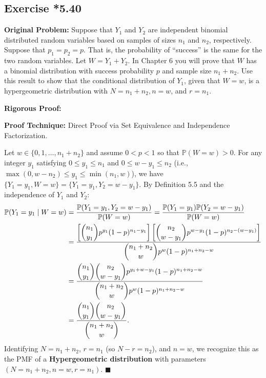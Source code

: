 \documentclass[11pt, letterpaper]{article}
\theoremstyle{definition}
\theoremstyle{remark}
\newcommand{\Prob}{\mathbb{P}}
\begin{document}
\subsection{Exercise *5.40}

\textbf{Original Problem:}
Suppose that $Y_1$ and $Y_2$ are independent binomial distributed random variables based on samples of sizes $n_1$ and $n_2$, respectively. Suppose that $p_1 = p_2 = p$. That is, the probability of ``success'' is the same for the two random variables. Let $W = Y_1 + Y_2$. In Chapter 6 you will prove that $W$ has a binomial distribution with success probability $p$ and sample size $n_1 + n_2$. Use this result to show that the conditional distribution of $Y_1$, given that $W = w$, is a hypergeometric distribution with $N = n_1 + n_2, n = w$, and $r = n_1$.

\textbf{Rigorous Proof:}

\textbf{Proof Technique:} Direct Proof via Set Equivalence and Independence Factorization.

Let $w \in \{0, 1, \dots, n_1 + n_2\}$ and assume $0 < p < 1$ so that $\Prob(W = w) > 0$. For any integer $y_1$ satisfying $0 \le y_1 \le n_1$ and $0 \le w - y_1 \le n_2$ (i.e., $\max(0, w - n_2) \le y_1 \le \min(n_1, w)$), we have $\{Y_1 = y_1, W = w\} = \{Y_1 = y_1, Y_2 = w - y_1\}$. By Definition 5.5 and the independence of $Y_1$ and $Y_2$:
\begin{align*}
    \Prob(Y_1 = y_1 \mid W = w) &= \frac{\Prob(Y_1 = y_1, Y_2 = w - y_1)}{\Prob(W = w)} = \frac{\Prob(Y_1 = y_1)\Prob(Y_2 = w - y_1)}{\Prob(W = w)} \\
    &= \frac{\left[\dbinom{n_1}{y_1} p^{y_1} (1 - p)^{n_1 - y_1}\right] \left[\dbinom{n_2}{w - y_1} p^{w - y_1} (1 - p)^{n_2 - (w - y_1)}\right]}{\dbinom{n_1 + n_2}{w} p^w (1 - p)^{n_1 + n_2 - w}} \\
    &= \frac{\dbinom{n_1}{y_1}\dbinom{n_2}{w - y_1} p^{y_1 + w - y_1} (1 - p)^{n_1 + n_2 - w}}{\dbinom{n_1 + n_2}{w} p^w (1 - p)^{n_1 + n_2 - w}} \\
    &= \frac{\dbinom{n_1}{y_1}\dbinom{n_2}{w - y_1}}{\dbinom{n_1 + n_2}{w}}.
\end{align*}
Identifying $N = n_1 + n_2$, $r = n_1$ (so $N - r = n_2$), and $n = w$, we recognize this as the PMF of a \textbf{Hypergeometric distribution} with parameters $(N = n_1 + n_2, n = w, r = n_1)$. $\blacksquare$
\end{document}
